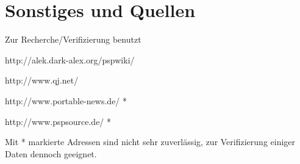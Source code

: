 \documentclass[mode=print,paper=screen,size=10pt,style=paintings]{powerdot}
\begin{document}
\section{Sonstiges und Quellen}
\begin{slide}{Zur Recherche/Verifizierung benutzt}
	\begin{list}{-}{}
		\item{http://alek.dark-alex.org/pspwiki/}
		\item{http://www.qj.net/}
		\item{http://www.portable-news.de/ *}
		\item{http://www.pspsource.de/ *}
	\end{list}
	Mit * markierte Adressen sind nicht sehr zuverlässig, zur Verifizierung einiger Daten dennoch geeignet.
\end{slide}
\end{document}
